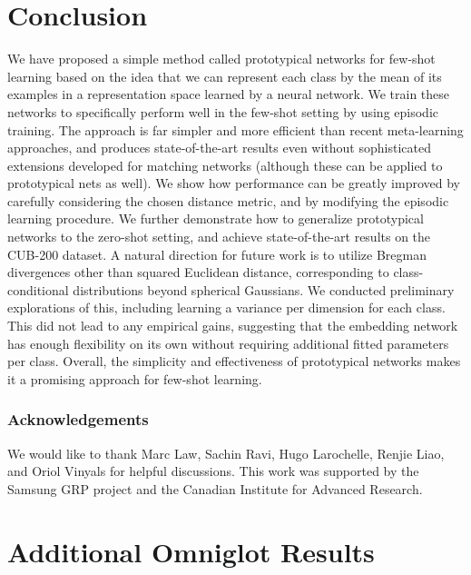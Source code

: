 \documentclass{article}
\begin{document}
\section{Conclusion}

We have proposed a simple method called prototypical networks for few-shot learning based on the idea that we can represent each class by the mean of its examples in a representation space learned by a neural network. We train these networks to specifically perform well in the few-shot setting by using episodic training. 
The approach is far simpler and more efficient than recent meta-learning approaches, and produces state-of-the-art results even without sophisticated extensions developed for matching networks (although these can be applied to prototypical nets as well). We show how performance can be greatly improved by carefully considering the chosen distance metric, and by modifying the episodic learning procedure. We further demonstrate how to generalize prototypical networks to the zero-shot setting, and achieve state-of-the-art results on the CUB-200 dataset. A natural direction for future work is to utilize Bregman divergences other than squared Euclidean distance, corresponding to class-conditional distributions beyond spherical Gaussians. We conducted preliminary explorations of this, including learning a variance per dimension for each class. This did not lead to any empirical gains, suggesting that the embedding network has enough flexibility on its own without requiring additional fitted parameters per class.  Overall, the simplicity and effectiveness of prototypical networks makes it a promising approach for few-shot learning.

\subsubsection*{Acknowledgements}

We would like to thank Marc Law, Sachin Ravi, Hugo Larochelle, Renjie Liao, and Oriol Vinyals for helpful discussions. This work was supported by the Samsung GRP project and the Canadian Institute for Advanced Research.

{
    \small
    
    
}

\clearpage
\appendix

\section{Additional Omniglot Results}
\end{document}
